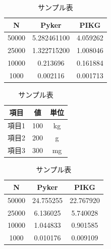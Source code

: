 \documentclass{jarticle}
\begin{document}
\begin{table}
  \centering %
  \caption{サンプル表} %
  \label{tab:sampleTable}
  \begin{tabular}{ccc} %
  \toprule
  N & Pyker & PIKG \\
  \midrule
  50000 & 5.282461100 & 4.059262 \\
  25000 & 1.322715200 & 1.008046 \\
  10000 & 0.213696 & 0.161884 \\
  1000 & 0.002116 & 0.001713 \\
\bottomrule
\end{tabular}
\end{table}
\begin{table}[ht]
  \centering %
  \caption{サンプル表} %
  \label{tab:sampleTable}
  \begin{tabular}{ccc} %
  \toprule
  項目 & 値 & 単位 \\
  \midrule
  項目1 & 100 & kg \\
  項目2 & 200 & g \\
  項目3 & 300 & mg \\
\bottomrule
\end{tabular}
\end{table}


\begin{table}[ht]
  \centering %
  \caption{サンプル表} %
  \label{tab:sampleTable}
  \begin{tabular}{ccc} %
  \toprule
  N & Pyker & PIKG \\
  \midrule
  50000 & 24.755255 & 22.767920 \\
  25000 & 6.136025 & 5.740028 \\
  10000 & 1.044833 & 0.901585\\
  1000 & 0.010176 & 0.009109 \\
\bottomrule
\end{tabular}
\end{table}
\end{document}
